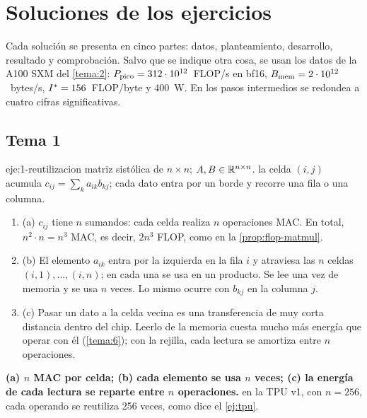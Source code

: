 \chapter{Soluciones de los ejercicios}
\label{ap:soluciones}

Cada solución se presenta en cinco partes: datos, planteamiento, desarrollo, resultado y comprobación. Salvo que se indique otra cosa, se usan los datos de la A100 SXM del \cref{tema:2}: $P_{\mathrm{pico}}=312\cdot 10^{12}$~FLOP/s en bf16, $B_{\mathrm{mem}}=2\cdot 10^{12}$~bytes/s, $I^{\ast}=156$~FLOP/byte y 400~W. En los pasos intermedios se redondea a cuatro cifras significativas.

\section{Tema 1}

\begin{solucion}{eje:1-reutilizacion}
\datos matriz sistólica de $n\times n$; $A,B\in\mathbb{R}^{n\times n}$.
\planteamiento la celda $(i,j)$ acumula $c_{ij}=\sum_{k}a_{ik}b_{kj}$; cada dato entra por un borde y recorre una fila o una columna.
\pasos
\begin{enumerate}[label=\arabic*.]
  \item (a) $c_{ij}$ tiene $n$ sumandos: cada celda realiza $n$ operaciones MAC. En total, $n^{2}\cdot n=n^{3}$ MAC, es decir, $2n^{3}$ FLOP, como en la \cref{prop:flop-matmul}.
  \item (b) El elemento $a_{ik}$ entra por la izquierda en la fila $i$ y atraviesa las $n$ celdas $(i,1),\dots,(i,n)$; en cada una se usa en un producto. Se lee una vez de memoria y se usa $n$ veces. Lo mismo ocurre con $b_{kj}$ en la columna $j$.
  \item (c) Pasar un dato a la celda vecina es una transferencia de muy corta distancia dentro del chip. Leerlo de la memoria cuesta mucho más energía que operar con él (\cref{tema:6}); con la rejilla, cada lectura se amortiza entre $n$ operaciones.
\end{enumerate}
\resultado \textbf{(a) $n$ MAC por celda; (b) cada elemento se usa $n$ veces; (c) la energía de cada lectura se reparte entre $n$ operaciones.}
\comprobacion en la TPU v1, con $n=256$, cada operando se reutiliza 256 veces, como dice el \cref{ej:tpu}.
\end{solucion}


